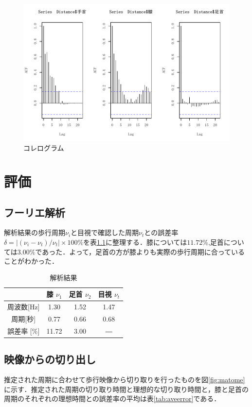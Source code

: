 \documentclass[a4j,10.5pt]{jreport}
\begin{document}
\begin{figure}
    \centering
    \includegraphics{figs/acf.pdf}
    \caption{コレログラム}
    \label{fig:acf}
\end{figure}


\chapter{評価}

\section{フーリエ解析}
解析結果の歩行周期$\nu_i$と目視で確認した周期$\nu_t$との誤差率$\delta =|(\nu_i-\nu_t)/\nu_t|\times100\%$を表\ref{tab:結果}に整理する．膝については$11.72\%$,足首については$3.00\%$であった．よって，足首の方が膝よりも実際の歩行周期に合っていることがわかった．
\begin{table}[H]
\vspace{5mm}
  \centering
  \begin{tabular}{c||ccc}
    \hline
            & 膝 $\nu_1$    & 足首 $\nu_2$  & 目視 $\nu_t$  \\ \hline
周波数{[}Hz{]} & 1.30  & 1.52 & 1.47 \\ \hline
周期{[}秒{]}   & 0.77  & 0.66 & 0.68 \\ \hline
誤差率 {[}$\%${]}      & 11.72 & 3.00 &   ―   \\ \hline
  \end{tabular}
  \caption{解析結果} \label{tab:結果}
\end{table}
\section{映像からの切り出し}
推定された周期に合わせて歩行映像から切り取りを行ったものを図\ref{fig:matome}に示す．推定された周期の切り取り時間と理想的な切り取り時間と，膝と足首の周期のそれぞれの理想時間との誤差率の平均は表\ref{tab:aveerror}である．
\end{document}
